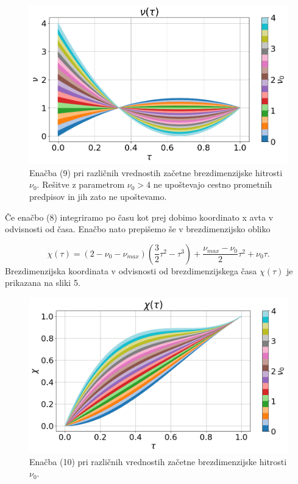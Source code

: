 \documentclass[slovene,11pt,a4paper]{article}
\begin{document}
\begin{figure}[h!]
\centering
\includegraphics[width=\linewidth]{Radar1.png}
\caption{Enačba (9) pri različnih vrednostih začetne brezdimenzijske hitrosti $\nu_0$. Rešitve z parametrom $\nu_0 > 4$ ne upoštevajo cestno prometnih predpisov in jih zato ne upoštevamo.}
\end{figure}

Če enačbo (8) integriramo po času kot prej dobimo koordinato x avta v odvisnosti od časa. Enačbo nato prepišemo še v brezdimenzijsko obliko

\begin{equation}
\chi(\tau) = (2-\nu_0-\nu_{max})\left(\frac{3}{2}\tau^2 - \tau^3 \right) + \frac{\nu_{max} - \nu_0}{2} \tau^2 + \nu_0 \tau.
\end{equation}
Brezdimenzijska koordinata v odvisnosti od brezdimenzijskega časa $\chi(\tau)$ je prikazana na sliki 5. 

\newpage

\begin{figure}[h!]
\centering
\includegraphics[width=\linewidth]{Radar2.png}
\caption{Enačba (10) pri različnih vrednostih začetne brezdimenzijske hitrosti $\nu_0$.}
\end{figure}
\end{document}
